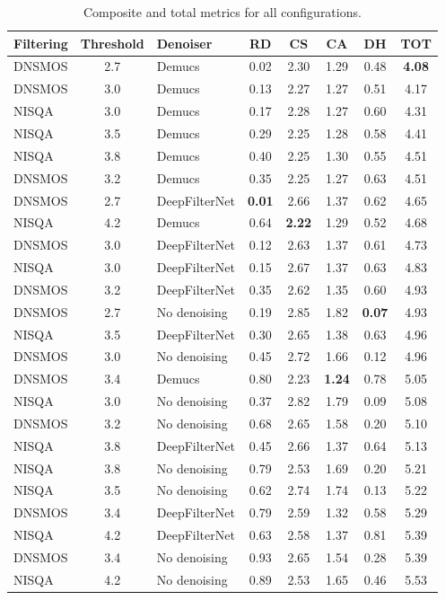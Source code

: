 \begin{table}[h]
\centering
\small
\caption{Composite and total metrics for all configurations.}
\label{tab:metricas_ranking}
\begin{tabular}{@{} l S l S[table-format=1.2] S[table-format=1.2] S[table-format=1.2] S[table-format=1.2] S[table-format=1.2] @{}}
\toprule
Filtering & {Threshold} & Denoiser & {RD} & {CS} & {CA} & {DH} & {TOT} \\
\midrule
DNSMOS  & 2.7 & Demucs        & 0.02 & 2.30 & 1.29 & 0.48 & \textbf{4.08} \\
DNSMOS  & 3.0 & Demucs        & 0.13 & 2.27 & 1.27 & 0.51 & 4.17 \\
NISQA   & 3.0 & Demucs        & 0.17 & 2.28 & 1.27 & 0.60 & 4.31 \\
NISQA   & 3.5 & Demucs        & 0.29 & 2.25 & 1.28 & 0.58 & 4.41 \\
NISQA   & 3.8 & Demucs        & 0.40 & 2.25 & 1.30 & 0.55 & 4.51 \\
DNSMOS  & 3.2 & Demucs        & 0.35 & 2.25 & 1.27 & 0.63 & 4.51 \\
DNSMOS  & 2.7 & DeepFilterNet & \textbf{0.01} & 2.66 & 1.37 & 0.62 & 4.65 \\
NISQA   & 4.2 & Demucs        & 0.64 & \textbf{2.22} & 1.29 & 0.52 & 4.68 \\
DNSMOS  & 3.0 & DeepFilterNet & 0.12 & 2.63 & 1.37 & 0.61 & 4.73 \\
NISQA   & 3.0 & DeepFilterNet & 0.15 & 2.67 & 1.37 & 0.63 & 4.83 \\
DNSMOS  & 3.2 & DeepFilterNet & 0.35 & 2.62 & 1.35 & 0.60 & 4.93 \\
DNSMOS  & 2.7 & No denoising  & 0.19 & 2.85 & 1.82 & \textbf{0.07} & 4.93 \\
NISQA   & 3.5 & DeepFilterNet & 0.30 & 2.65 & 1.38 & 0.63 & 4.96 \\
DNSMOS  & 3.0 & No denoising  & 0.45 & 2.72 & 1.66 & 0.12 & 4.96 \\
DNSMOS  & 3.4 & Demucs        & 0.80 & 2.23 & \textbf{1.24} & 0.78 & 5.05 \\
NISQA   & 3.0 & No denoising  & 0.37 & 2.82 & 1.79 & 0.09 & 5.08 \\
DNSMOS  & 3.2 & No denoising  & 0.68 & 2.65 & 1.58 & 0.20 & 5.10 \\
NISQA   & 3.8 & DeepFilterNet & 0.45 & 2.66 & 1.37 & 0.64 & 5.13 \\
NISQA   & 3.8 & No denoising  & 0.79 & 2.53 & 1.69 & 0.20 & 5.21 \\
NISQA   & 3.5 & No denoising  & 0.62 & 2.74 & 1.74 & 0.13 & 5.22 \\
DNSMOS  & 3.4 & DeepFilterNet & 0.79 & 2.59 & 1.32 & 0.58 & 5.29 \\
NISQA   & 4.2 & DeepFilterNet & 0.63 & 2.58 & 1.37 & 0.81 & 5.39 \\
DNSMOS  & 3.4 & No denoising  & 0.93 & 2.65 & 1.54 & 0.28 & 5.39 \\
NISQA   & 4.2 & No denoising  & 0.89 & 2.53 & 1.65 & 0.46 & 5.53 \\
\bottomrule
\end{tabular}
\end{table}

